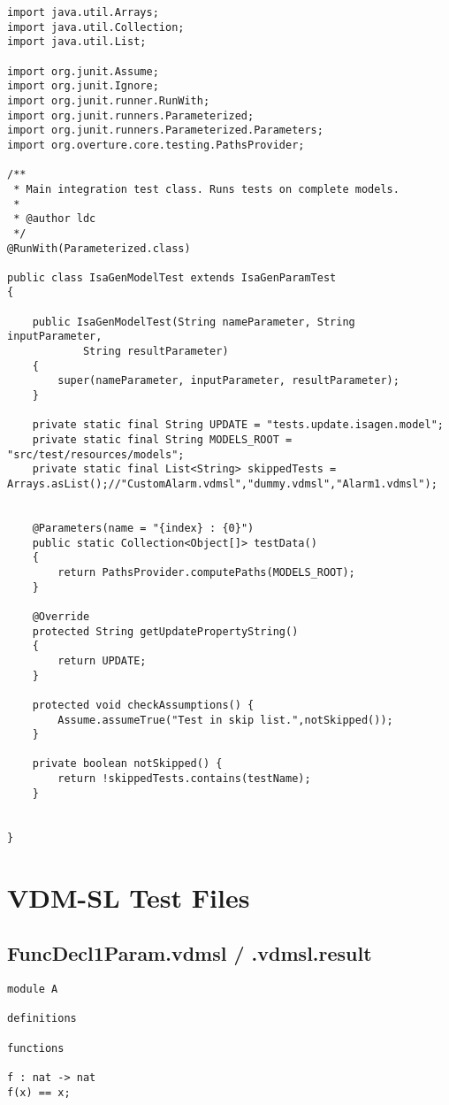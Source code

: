 \begin{appendices}
\begin{lstlisting}
import java.util.Arrays;
import java.util.Collection;
import java.util.List;

import org.junit.Assume;
import org.junit.Ignore;
import org.junit.runner.RunWith;
import org.junit.runners.Parameterized;
import org.junit.runners.Parameterized.Parameters;
import org.overture.core.testing.PathsProvider;

/**
 * Main integration test class. Runs tests on complete models.
 * 
 * @author ldc
 */
@RunWith(Parameterized.class)

public class IsaGenModelTest extends IsaGenParamTest
{

    public IsaGenModelTest(String nameParameter, String inputParameter,
            String resultParameter)
    {
        super(nameParameter, inputParameter, resultParameter);
    }

    private static final String UPDATE = "tests.update.isagen.model";
    private static final String MODELS_ROOT = "src/test/resources/models";
    private static final List<String> skippedTests = Arrays.asList();//"CustomAlarm.vdmsl","dummy.vdmsl","Alarm1.vdmsl");


    @Parameters(name = "{index} : {0}")
    public static Collection<Object[]> testData()
    {
        return PathsProvider.computePaths(MODELS_ROOT);
    }

    @Override
    protected String getUpdatePropertyString()
    {
        return UPDATE;
    }

    protected void checkAssumptions() {
        Assume.assumeTrue("Test in skip list.",notSkipped());
    }

    private boolean notSkipped() {
        return !skippedTests.contains(testName);
    }


}

\end{lstlisting}

\section{VDM-SL Test Files} \label{vdmsl}
\subsection{FuncDecl1Param.vdmsl / .vdmsl.result}
\begin{lstlisting}
module A

definitions

functions

f : nat -> nat
f(x) == x;


\end{lstlisting}
\end{appendices}
